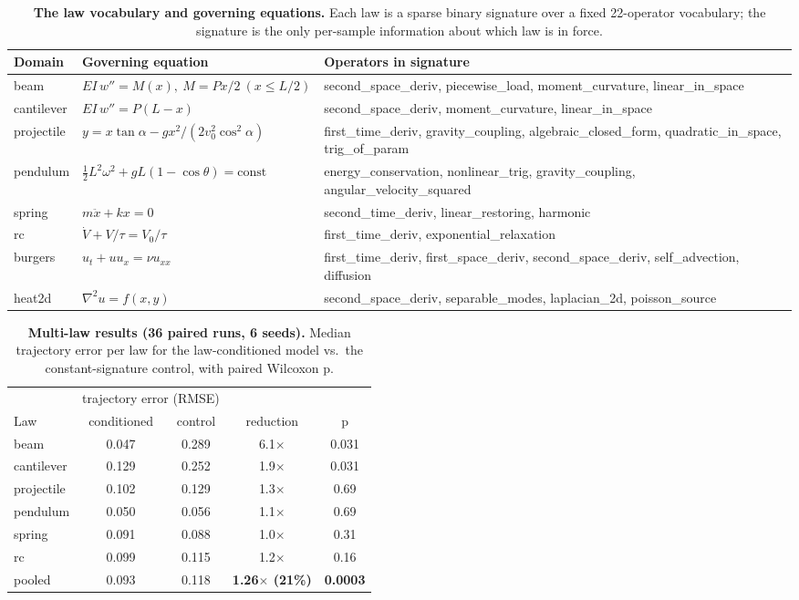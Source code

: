 \documentclass[11pt,a4paper]{article}
\begin{document}
\begin{table}[t]
\centering
\caption{\textbf{The law vocabulary and governing equations.} Each law is a
sparse binary signature over a fixed 22-operator vocabulary; the signature is
the only per-sample information about which law is in force.}
\label{tab:laws}
\small
\begin{tabular}{@{}lll@{}}
\toprule
Domain & Governing equation & Operators in signature \\
\midrule
beam & $EI\,w'' = M(x),\ M = Px/2\ (x\le L/2)$ & second\_space\_deriv, piecewise\_load, moment\_curvature, linear\_in\_space \\
cantilever & $EI\,w'' = P(L-x)$ & second\_space\_deriv, moment\_curvature, linear\_in\_space \\
projectile & $y = x\tan\alpha - gx^2/(2v_0^2\cos^2\alpha)$ & first\_time\_deriv, gravity\_coupling, algebraic\_closed\_form, quadratic\_in\_space, trig\_of\_param \\
pendulum & $\tfrac{1}{2}L^2\omega^2 + gL(1-\cos\theta) = \mathrm{const}$ & energy\_conservation, nonlinear\_trig, gravity\_coupling, angular\_velocity\_squared \\
spring & $m\ddot{x} + kx = 0$ & second\_time\_deriv, linear\_restoring, harmonic \\
rc & $\dot{V} + V/\tau = V_0/\tau$ & first\_time\_deriv, exponential\_relaxation \\
burgers & $u_t + uu_x = \nu u_{xx}$ & first\_time\_deriv, first\_space\_deriv, second\_space\_deriv, self\_advection, diffusion \\
heat2d & $\nabla^2 u = f(x,y)$ & second\_space\_deriv, separable\_modes, laplacian\_2d, poisson\_source \\
\bottomrule
\end{tabular}
\end{table}

\begin{table}[t]
\centering
\caption{\textbf{Multi-law results (36 paired runs, 6 seeds).} Median
trajectory error per law for the law-conditioned model vs.\ the
constant-signature control, with paired Wilcoxon p.}
\label{tab:multilaw}
\small
\begin{tabular}{@{}lcccc@{}}
\toprule
 & \multicolumn{2}{c}{trajectory error (RMSE)} & & \\
\cmidrule(lr){2-3}
Law & conditioned & control & reduction & p \\
\midrule
beam & 0.047 & 0.289 & 6.1$\times$ & 0.031 \\
cantilever & 0.129 & 0.252 & 1.9$\times$ & 0.031 \\
projectile & 0.102 & 0.129 & 1.3$\times$ & 0.69 \\
pendulum & 0.050 & 0.056 & 1.1$\times$ & 0.69 \\
spring & 0.091 & 0.088 & 1.0$\times$ & 0.31 \\
rc & 0.099 & 0.115 & 1.2$\times$ & 0.16 \\
\midrule
pooled & 0.093 & 0.118 & \textbf{1.26$\times$ (21\%)} & \textbf{0.0003} \\
\bottomrule
\end{tabular}
\end{table}
\end{document}
